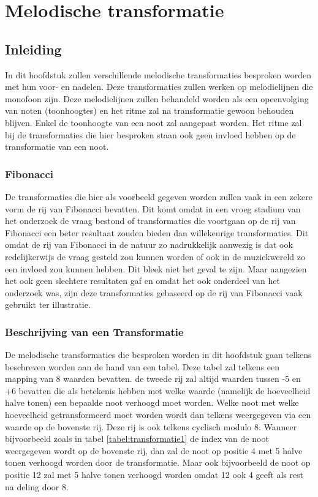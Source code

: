\chapter{Melodische transformatie}
\label{hoofdstuk:MT}

\section{Inleiding}
In dit hoofdstuk zullen verschillende melodische transformaties besproken worden met hun voor- en nadelen. Deze transformaties zullen werken op melodielijnen die monofoon zijn. Deze melodielijnen zullen behandeld worden als een opeenvolging van noten (toonhoogtes) en het ritme zal na transformatie gewoon behouden blijven. Enkel de toonhoogte van een noot zal aangepast worden. Het ritme zal bij de transformaties die hier besproken staan ook geen invloed hebben op de transformatie van een noot. 

\subsection{Fibonacci}
De transformaties die hier als voorbeeld gegeven worden zullen vaak in een zekere vorm de rij van Fibonacci\cite{url:Fibonacci} bevatten. Dit komt omdat in een vroeg stadium van het onderzoek de vraag bestond of transformaties die voortgaan op de rij van Fibonacci een beter resultaat zouden bieden dan willekeurige transformaties. Dit omdat de rij van Fibonacci in de natuur zo nadrukkelijk aanwezig is dat ook redelijkerwijs de vraag gesteld zou kunnen worden of ook in de muziekwereld zo een invloed zou kunnen hebben. Dit bleek niet het geval te zijn. Maar aangezien het ook geen slechtere resultaten gaf en omdat het ook onderdeel van het onderzoek was, zijn deze transformaties gebaseerd op de rij van Fibonacci vaak gebruikt ter illustratie.

\subsection{Beschrijving van een Transformatie}
De melodische transformaties die besproken worden in dit hoofdstuk gaan telkens beschreven worden aan de hand van een tabel. Deze tabel zal telkens een mapping van 8 waarden bevatten. de tweede rij zal altijd waarden tussen -5 en +6 bevatten die als betekenis hebben met welke waarde (namelijk de hoeveelheid halve tonen) een bepaalde noot verhoogd moet worden. Welke noot met welke hoeveelheid getransformeerd moet worden wordt dan telkens weergegeven via een waarde op de bovenste rij. Deze rij is ook telkens cyclisch modulo 8. Wanneer bijvoorbeeld zoals in tabel \ref{tabel:transformatie1} de index van de noot weergegeven wordt op de bovenste rij, dan zal de noot op positie 4 met 5 halve tonen verhoogd worden door de transformatie. Maar ook bijvoorbeeld de noot op positie 12 zal met 5 halve tonen verhoogd worden omdat 12 ook 4 geeft als rest na deling door 8.

